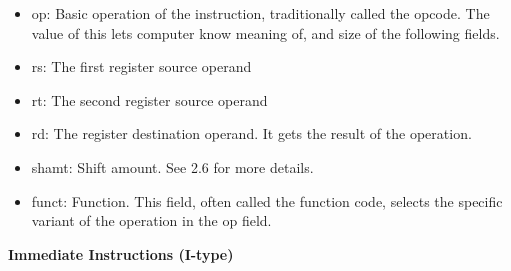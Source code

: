 \documentclass[10pt]{article}
\begin{document}
\begin{itemize}
\item op: Basic operation of the instruction, traditionally called the opcode.  The value of this lets computer know meaning of, and size of the following fields.
\item rs: The first register source operand
\item rt: The second register source operand
\item rd: The register destination operand. It gets the result of the operation.
\item shamt: Shift amount. See 2.6 for more details.
\item funct: Function. This field, often called the function code, selects the specific variant of the operation in the op field.
\end{itemize}
\textbf{Immediate Instructions (I-type)}\\
\end{document}
